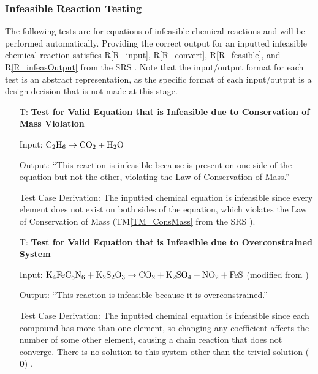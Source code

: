 \documentclass[12pt, titlepage]{article}
\newcounter{testnum} %
\newcommand{\tmref}[1]{TM\ref{#1}}
\newcommand{\rref}[1]{R\ref{#1}}
\begin{document}
\subsubsection{Infeasible Reaction Testing}

The following tests are for equations of infeasible chemical reactions and
will be performed automatically. Providing the correct output for an inputted
infeasible chemical reaction satisfies \rref{R_input}, \rref{R_convert},
\rref{R_feasible}, and \rref{R_infeasOutput} from the SRS \cite{srs}.
Note that the input/output format
for each test is an abstract representation, as the specific format of each
input/output is a design decision that is not made at this stage.

\begin{enumerate}

  \item[T\refstepcounter{testnum}\thetestnum \label{test_inf_cons_mass_valid_eqn}:]
    \textbf{Test for Valid Equation that is Infeasible due to Conservation of Mass
      Violation}

    Input: $\ce{C2H6} \rightarrow \ce{CO2} + \ce{H2O}$

    Output: ``This reaction is infeasible because  is present on one side
    of the equation but not the other, violating the Law of Conservation of
    Mass.''

    Test Case Derivation: The inputted chemical equation is infeasible since
    every element does not exist on both sides of the equation, which violates
    the Law of Conservation of Mass (\tmref{TM_ConsMass} from the SRS
    \cite{srs}).

  \item[T\refstepcounter{testnum}\thetestnum \label{test_inf_over_valid_eqn}:]
    \textbf{Test for Valid Equation that is Infeasible due to Overconstrained
      System}

    Input: $\ce{K4FeC6N6} + \ce{K2S2O3} \rightarrow \ce{CO2} + \ce{K2SO4} +
      \ce{NO2} + \ce{FeS}$ (modified from \cite{hamid_balancing_2019})

    Output: ``This reaction is infeasible because it is overconstrained.''

    Test Case Derivation: The inputted chemical equation is infeasible since
    each compound has more than one element, so changing any coefficient
    affects the number of some other element, causing a chain reaction that
    does not converge. There is no solution to this system other than the
    trivial solution ($\mathbf{0}$) \cite{hamid_balancing_2019}.

\end{enumerate}
\end{document}
